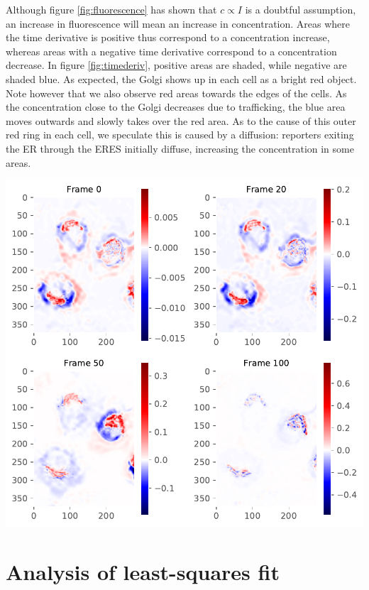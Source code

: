 \documentclass{Dissertate}
\let\origfigure\figure
\let\endorigfigure\endfigure
\renewenvironment{figure}[1][2] {
    \expandafter\origfigure\expandafter[H]
} {
    \endorigfigure
}
\begin{document}
Although figure \ref{fig:fluorescence} has shown that $c\propto I$ is a doubtful assumption, an increase in fluorescence will mean an increase in concentration. Areas where the time derivative is positive thus correspond to a concentration increase, whereas areas with a negative time derivative correspond to a concentration decrease. In figure \ref{fig:timederiv}, positive areas are shaded, while negative are shaded blue. As expected, the Golgi shows up in each
cell as a bright red object. Note however that we also observe red areas
towards the edges of the cells. As the concentration close to the Golgi
decreases due to trafficking, the blue area moves outwards and slowly takes over the red area. As to the cause of this outer red ring in each cell, we speculate this is caused by a diffusion: reporters exiting the ER through the ERES initially diffuse, increasing the concentration in some areas. 


\begin{figure}
\hypertarget{fig:timederiv}{%
\centering
\includegraphics{source/figures/pdf/time_deriv.pdf}
\caption{The determined time derivative four different frames of the
ManII RUSH experiments.\label{fig:timederiv}}
}
\end{figure}


\hypertarget{analysis-of-ls-fit}{%
\section{Analysis of least-squares fit}\label{analysis-of-ls-fit}}
\end{document}
